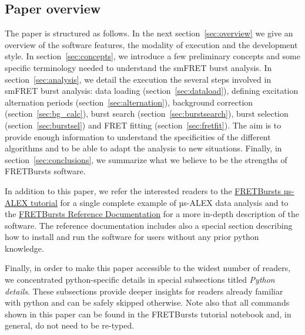 \subsection{Paper overview}

The paper is structured as follows.
In the next section~\ref{sec:overview} we give an overview of the software features,
the modality of execution and the development style.
In section~\ref{sec:concepts}, we
introduce a few preliminary concepts and some specific terminology needed
to understand the smFRET burst analysis.
In section~\ref{sec:analysis}, we detail the execution the several steps involved
in smFRET burst analysis: data loading (section~\ref{sec:dataload}), defining
excitation alternation periods (section~\ref{sec:alternation}), background
correction (section~\ref{sec:bg_calc}), burst search (section~\ref{sec:burstsearch}),
burst selection (section~\ref{sec:burstsel}) and FRET fitting (section~\ref{sec:fretfit}).
The aim is to provide enough information to understand the specificities of
the different algorithms and to be able to adapt the analysis to new situations.
Finally, in section~\ref{sec:conclusions}, we summarize what we believe to be
the strengths of FRETBursts software.

In addition to this paper, we refer the interested readers to the
\href{http://nbviewer.ipython.org/github/tritemio/FRETBursts_notebooks/blob/master/notebooks/FRETBursts\%20-\%20us-ALEX\%20smFRET\%20burst\%20analysis.ipynb}{FRETBursts µs-ALEX tutorial}
for a single complete example of µs-ALEX data analysis and to the
\href{http://fretbursts.readthedocs.org/}{FRETBursts Reference Documentation}
for a more in-depth description of the software. The reference documentation
includes also a special section describing how to install and run the software
for users without any prior python knowledge.

Finally, in order to make this paper accessible to the widest number of readers,
we concentrated python-specific details in special subsections titled
\textit{Python details}. These subsections provide deeper insights for readers
already familiar with python and can be safely skipped otherwise. Note also
that all commands shown in this paper can be found in the FRETBursts tutorial notebook
and, in general, do not need to be re-typed.

